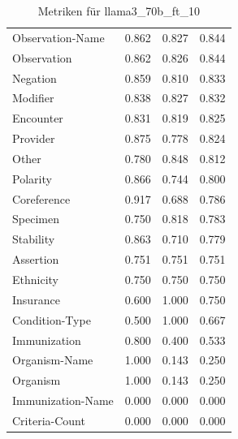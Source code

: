\begin{table}[htbp]
\begin{tabular}{p{5cm}ccc}
Observation-Name & 0.862 & 0.827 & 0.844 \\
Observation & 0.862 & 0.826 & 0.844 \\
Negation & 0.859 & 0.810 & 0.833 \\
Modifier & 0.838 & 0.827 & 0.832 \\
Encounter & 0.831 & 0.819 & 0.825 \\
Provider & 0.875 & 0.778 & 0.824 \\
Other & 0.780 & 0.848 & 0.812 \\
Polarity & 0.866 & 0.744 & 0.800 \\
Coreference & 0.917 & 0.688 & 0.786 \\
Specimen & 0.750 & 0.818 & 0.783 \\
Stability & 0.863 & 0.710 & 0.779 \\
Assertion & 0.751 & 0.751 & 0.751 \\
Ethnicity & 0.750 & 0.750 & 0.750 \\
Insurance & 0.600 & 1.000 & 0.750 \\
Condition-Type & 0.500 & 1.000 & 0.667 \\
Immunization & 0.800 & 0.400 & 0.533 \\
Organism-Name & 1.000 & 0.143 & 0.250 \\
Organism & 1.000 & 0.143 & 0.250 \\
Immunization-Name & 0.000 & 0.000 & 0.000 \\
Criteria-Count & 0.000 & 0.000 & 0.000 \\
\bottomrule
\end{tabular}
\caption{Metriken für llama3_70b_ft_10}
\label{tab:metrics_llama3_70b_ft_10}
\end{table}